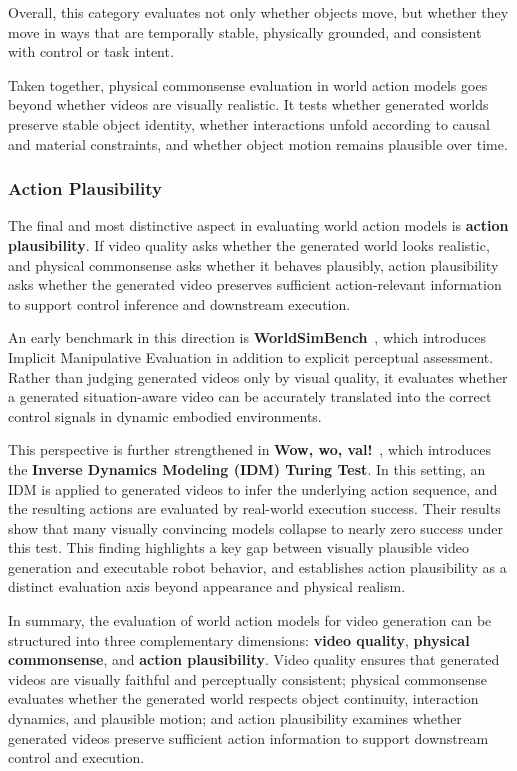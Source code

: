 Overall, this category evaluates not only whether objects move, but whether they move in ways that are temporally stable, physically grounded, and consistent with control or task intent.

Taken together, physical commonsense evaluation in world action models goes beyond whether videos are visually realistic. It tests whether generated worlds preserve stable object identity, whether interactions unfold according to causal and material constraints, and whether object motion remains plausible over time.


\subsubsection{Action Plausibility}
\label{sec:eval_world_action}
The final and most distinctive aspect in evaluating world action models is \textbf{action plausibility}. If video quality asks whether the generated world looks realistic, and physical commonsense asks whether it behaves plausibly, action plausibility asks whether the generated video preserves sufficient action-relevant information to support control inference and downstream execution.

An early benchmark in this direction is \textbf{WorldSimBench}~\citep{qin2024worldsimbenchvideogenerationmodels}, which introduces Implicit Manipulative Evaluation in addition to explicit perceptual assessment. Rather than judging generated videos only by visual quality, it evaluates whether a generated situation-aware video can be accurately translated into the correct control signals in dynamic embodied environments.

This perspective is further strengthened in \textbf{Wow, wo, val!}~\citep{fan2026wow}, which introduces the \textbf{Inverse Dynamics Modeling (IDM) Turing Test}. In this setting, an IDM is applied to generated videos to infer the underlying action sequence, and the resulting actions are evaluated by real-world execution success. Their results show that many visually convincing models collapse to nearly zero success under this test. This finding highlights a key gap between visually plausible video generation and executable robot behavior, and establishes action plausibility as a distinct evaluation axis beyond appearance and physical realism.




In summary, the evaluation of world action models for video generation can be structured into three complementary dimensions: \textbf{video quality}, \textbf{physical commonsense}, and \textbf{action plausibility}. Video quality ensures that generated videos are visually faithful and perceptually consistent; physical commonsense evaluates whether the generated world respects object continuity, interaction dynamics, and plausible motion; and action plausibility examines whether generated videos preserve sufficient action information to support downstream control and execution.


